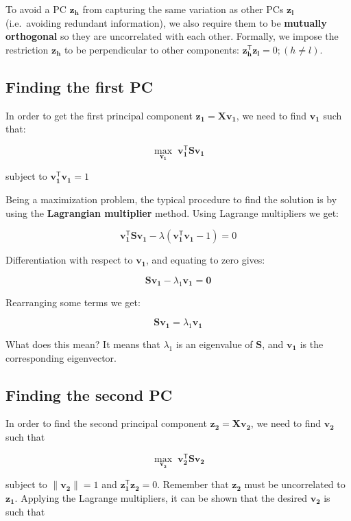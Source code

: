 \documentclass[]{book}
\begin{document}
To avoid a PC \(\mathbf{z_h}\) from capturing the same variation as other PCs
\(\mathbf{z_l}\) (i.e.~avoiding redundant information), we also require them to be
\textbf{mutually orthogonal} so they are uncorrelated with each other. Formally,
we impose the restriction \(\mathbf{z_h}\) to be perpendicular to other components:
\(\mathbf{z_{h}^\mathsf{T} z_l} = 0; (h \neq l)\).

\hypertarget{finding-the-first-pc}{%
\subsection{Finding the first PC}\label{finding-the-first-pc}}

In order to get the first principal component \(\mathbf{z_1} = \mathbf{X v_1}\),
we need to find \(\mathbf{v_1}\) such that:

\[
\max_{\mathbf{v_1}} \; \mathbf{v_{1}^\mathsf{T} S v_1}
\]

subject to \(\mathbf{v_{1}^\mathsf{T} v_1} = 1\)

Being a maximization problem, the typical procedure to find the solution is by
using the \textbf{Lagrangian multiplier} method. Using Lagrange multipliers we get:

\[
\mathbf{v_{1}^\mathsf{T} S v_1} - \lambda (\mathbf{v_{1}^\mathsf{T} v_1} - 1) = 0
\]

Differentiation with respect to \(\mathbf{v_1}\), and equating to zero gives:

\[
\mathbf{S v_1} - \lambda_1 \mathbf{v_1} = \mathbf{0}
\]

Rearranging some terms we get:

\[
\mathbf{S v_1} = \lambda_1 \mathbf{v_1}
\]

What does this mean? It means that \(\lambda_1\) is an eigenvalue of \(\mathbf{S}\),
and \(\mathbf{v_1}\) is the corresponding eigenvector.

\hypertarget{finding-the-second-pc}{%
\subsection{Finding the second PC}\label{finding-the-second-pc}}

In order to find the second principal component \(\mathbf{z_2} = \mathbf{X v_2}\),
we need to find \(\mathbf{v_2}\) such that

\[
\max_{\mathbf{v_2}} \; \mathbf{v_{2}^\mathsf{T} S v_2}
\]

subject to \(\| \mathbf{v_2} \| = 1\) and \(\mathbf{z_{1}^\mathsf{T} z_2} = 0\).
Remember that \(\mathbf{z_2}\) must be uncorrelated to \(\mathbf{z_1}\).
Applying the Lagrange multipliers, it can be shown that the desired
\(\mathbf{v_2}\) is such that
\end{document}
